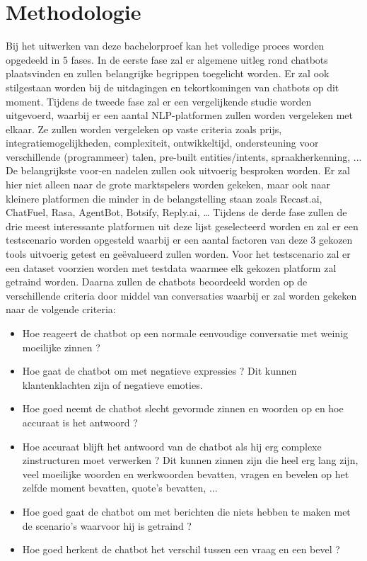 \section{Methodologie}
\label{sec:methodologie}

Bij het uitwerken van deze bachelorproef kan het volledige proces worden opgedeeld in 5 fases.
In de eerste fase zal er algemene uitleg rond chatbots plaatsvinden en zullen belangrijke begrippen toegelicht worden. Er zal ook stilgestaan worden bij de uitdagingen en tekortkomingen van chatbots op dit moment. Tijdens de tweede fase zal er een vergelijkende studie worden uitgevoerd, waarbij er een aantal NLP-platformen zullen worden vergeleken met elkaar. Ze zullen worden vergeleken op vaste criteria zoals prijs, integratiemogelijkheden, complexiteit, ontwikkeltijd, ondersteuning voor verschillende (programmeer) talen, pre-built entities/intents, spraakherkenning, ... De belangrijkste voor-en nadelen zullen ook uitvoerig besproken worden. Er zal hier niet alleen naar de grote marktspelers worden gekeken, maar ook naar kleinere platformen die minder in de belangstelling staan zoals Recast.ai, ChatFuel, Rasa, AgentBot, Botsify, Reply.ai, … Tijdens de derde fase zullen de drie meest interessante platformen uit deze lijst geselecteerd worden en zal er een testscenario worden opgesteld waarbij er een aantal factoren van deze 3 gekozen tools uitvoerig getest en geëvalueerd zullen worden. Voor het testscenario zal er een dataset voorzien worden met testdata waarmee elk gekozen platform zal getraind worden. Daarna zullen de chatbots beoordeeld worden op de verschillende criteria door middel van conversaties waarbij er zal worden gekeken naar de volgende criteria:\bigskip

\begin{itemize}
    \item Hoe reageert de chatbot op een normale eenvoudige conversatie met weinig moeilijke zinnen ?
    \item Hoe gaat de chatbot om met negatieve expressies ? Dit kunnen klantenklachten zijn of negatieve emoties.
    \item Hoe goed neemt de chatbot slecht gevormde zinnen en woorden op en hoe accuraat is het antwoord ?
    \item Hoe accuraat blijft het antwoord van de chatbot als hij erg complexe zinstructuren moet verwerken ? Dit kunnen zinnen zijn die heel erg lang zijn, veel moeilijke woorden en werkwoorden bevatten, vragen en bevelen op het zelfde moment bevatten, quote's bevatten, ...
    \item Hoe goed gaat de chatbot om met berichten die niets hebben te maken met de scenario’s waarvoor hij is getraind ?
    \item Hoe goed herkent de chatbot het verschil tussen een vraag en een bevel ?
\end{itemize}

